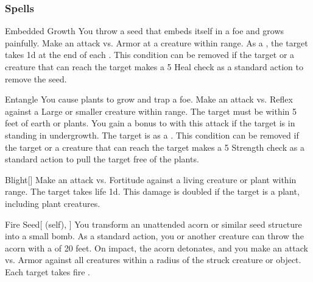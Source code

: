 \subsubsection{Spells}


\begin{ability}[\nth{1}]{Embedded Growth}
You throw a seed that embeds itself in a foe and grows painfully.
Make an attack vs. Armor at a creature within \rngclose range.
\hit As a , the target takes  \plus1d at the end of each .
This condition can be removed if the target or a creature that can reach the target makes a  5 Heal check as a standard action to remove the seed.
\end{ability}
\vspace{0.25em}



\begin{ability}[\nth{1}]{Entangle}
You cause plants to grow and trap a foe.
Make an attack vs. Reflex against a Large or smaller creature within \rngmed range.
The target must be within 5 feet of earth or plants.
You gain a  bonus to  with this attack if the target is in standing in undergrowth.
\hit The target is  as a .
This condition can be removed if the target or a creature that can reach the target makes a  5 Strength check as a standard action to pull the target free of the plants.
\end{ability}
\vspace{0.25em}



\begin{ability}[\nth{2}]{Blight}[]
Make an attack vs. Fortitude against a living creature or plant within \rngmed range.
\hit The target takes life  \plus1d.
This damage is doubled if the target is a plant, including plant creatures.
\end{ability}
\vspace{0.25em}



\begin{ability}[\nth{2}]{Fire Seed}[ (self), ]
You transform an unattended acorn or similar seed structure into a small bomb.
As a standard action, you or another creature can throw the acorn with a  of 20 feet.
On impact, the acorn detonates, and you make an attack vs. Armor against all creatures within a \areasmall radius of the struck creature or object.
\hit Each target takes fire .
\end{ability}
\vspace{0.25em}



